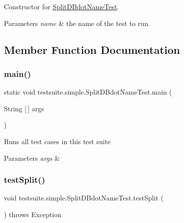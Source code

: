 Constructor for \mbox{\hyperlink{classtestsuite_1_1simple_1_1_split_d_bdot_name_test}{Split\+D\+Bdot\+Name\+Test}}.


\begin{DoxyParams}{Parameters}
{\em name} & the name of the test to run. \\
\hline
\end{DoxyParams}


\subsection{Member Function Documentation}
\mbox{\label{classtestsuite_1_1simple_1_1_split_d_bdot_name_test_acb8ba7fcbc46d143cfda1afb2530249b}} 
\subsubsection{\texorpdfstring{main()}{main()}}
{\footnotesize\ttfamily static void testsuite.\+simple.\+Split\+D\+Bdot\+Name\+Test.\+main (\begin{DoxyParamCaption}\item[{String \mbox{[}$\,$\mbox{]}}]{args }\end{DoxyParamCaption})\hspace{0.3cm}{\ttfamily [static]}}

Runs all test cases in this test suite


\begin{DoxyParams}{Parameters}
{\em args} & \\
\hline
\end{DoxyParams}
\mbox{\label{classtestsuite_1_1simple_1_1_split_d_bdot_name_test_a079789e05d1272485f650f92c91777fa}} 
\subsubsection{\texorpdfstring{test\+Split()}{testSplit()}}
{\footnotesize\ttfamily void testsuite.\+simple.\+Split\+D\+Bdot\+Name\+Test.\+test\+Split (\begin{DoxyParamCaption}{ }\end{DoxyParamCaption}) throws Exception}

